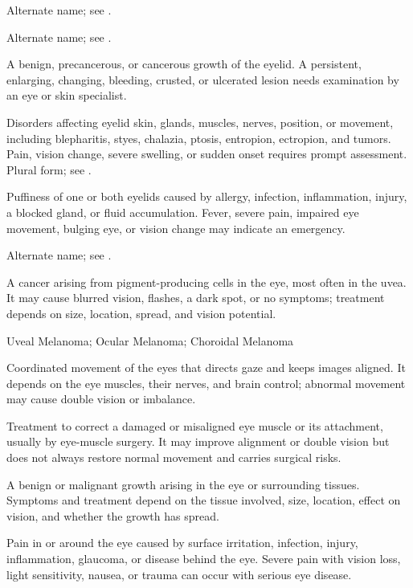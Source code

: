  Alternate name; see .

 Alternate name; see .

 A benign, precancerous, or cancerous growth of the eyelid. A persistent, enlarging, changing, bleeding, crusted, or ulcerated lesion needs examination by an eye or skin specialist.

 Disorders affecting eyelid skin, glands, muscles, nerves, position, or movement, including blepharitis, styes, chalazia, ptosis, entropion, ectropion, and tumors. Pain, vision change, severe swelling, or sudden onset requires prompt assessment.
 Plural form; see .

 Puffiness of one or both eyelids caused by allergy, infection, inflammation, injury, a blocked gland, or fluid accumulation. Fever, severe pain, impaired eye movement, bulging eye, or vision change may indicate an emergency.

 Alternate name; see .

 A cancer arising from pigment-producing cells in the eye, most often in the uvea. It may cause blurred vision, flashes, a dark spot, or no symptoms; treatment depends on size, location, spread, and vision potential.

\synonyms
Uveal Melanoma; Ocular Melanoma; Choroidal Melanoma

 Coordinated movement of the eyes that directs gaze and keeps images aligned. It depends on the eye muscles, their nerves, and brain control; abnormal movement may cause double vision or imbalance.

 Treatment to correct a damaged or misaligned eye muscle or its attachment, usually by eye-muscle surgery. It may improve alignment or double vision but does not always restore normal movement and carries surgical risks.

 A benign or malignant growth arising in the eye or surrounding tissues. Symptoms and treatment depend on the tissue involved, size, location, effect on vision, and whether the growth has spread.

 Pain in or around the eye caused by surface irritation, infection, injury, inflammation, glaucoma, or disease behind the eye. Severe pain with vision loss, light sensitivity, nausea, or trauma can occur with serious eye disease.

